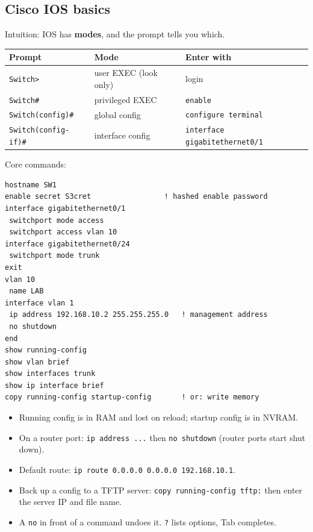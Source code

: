 \documentclass[11pt,a4paper]{article}
\begin{document}
\subsection{Cisco IOS basics}
Intuition: IOS has \textbf{modes}, and the prompt tells you which.

\begin{center}\small\renewcommand{\arraystretch}{1.18}\setlength{\tabcolsep}{9pt}
\begin{tabularx}{\linewidth}{@{}>{\raggedright\arraybackslash}X>{\raggedright\arraybackslash}X>{\raggedright\arraybackslash}X@{}}
\toprule
\textbf{\color{slate}Prompt} & \textbf{\color{slate}Mode} & \textbf{\color{slate}Enter with} \\ \midrule
\texttt{Switch>} & user EXEC (look only) & login \\
\texttt{Switch\#} & privileged EXEC & \texttt{enable} \\
\texttt{Switch(config)\#} & global config & \texttt{configure terminal} \\
\texttt{Switch(config-if)\#} & interface config & \texttt{interface gigabitethernet0/1} \\
\bottomrule
\end{tabularx}\end{center}
Core commands:

\begin{lstlisting}
hostname SW1
enable secret S3cret                 ! hashed enable password
interface gigabitethernet0/1
 switchport mode access
 switchport access vlan 10
interface gigabitethernet0/24
 switchport mode trunk
exit
vlan 10
 name LAB
interface vlan 1
 ip address 192.168.10.2 255.255.255.0   ! management address
 no shutdown
end
show running-config
show vlan brief
show interfaces trunk
show ip interface brief
copy running-config startup-config       ! or: write memory
\end{lstlisting}
\begin{itemize}
\item Running config is in RAM and lost on reload; startup config is in NVRAM.
\item On a router port: \texttt{ip address ...} then \texttt{no shutdown} (router ports start shut down).
\item Default route: \texttt{ip route 0.0.0.0 0.0.0.0 192.168.10.1}.
\item Back up a config to a TFTP server: \texttt{copy running-config tftp:} then enter the server IP and file name.
\item A \texttt{no} in front of a command undoes it. \texttt{?} lists options, Tab completes.
\end{itemize}
\end{document}

